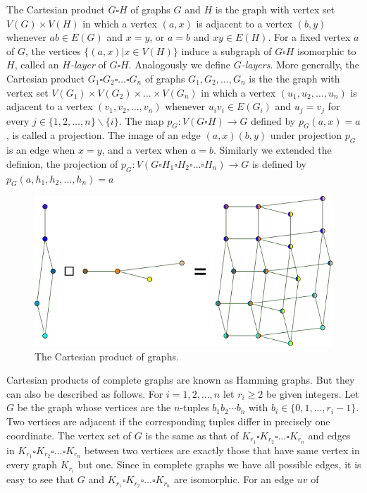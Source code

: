 \documentclass[12pt,a4paper,titlepage,openany]{report}
\begin{document}
The Cartesian product $G\square H$ of graphs $G$ and $H$ is the graph with vertex set $V(G)\times V(H)$ in which a vertex $(a,x)$ is adjacent to a vertex $(b,y)$ whenever
$ab\in E(G)$ and $x=y$, or $a=b$ and $xy\in E(H)$. For a fixed vertex $a$ of $G$, the vertices $\{(a,x)|x\in V(H)\}$ induce a subgraph of $G \square H$ isomorphic to $H$, called an \textit{$H$-layer} of $G \square H$. Analogously we define \textit{$G$-layers}.\newline
More generally, the Cartesian product $G_1\square G_2 \square \ldots \square G_n$ of graphs $G_1,G_2,\ldots, G_n$ is the the graph with vertex set $V(G_1)\times V(G_2)\times \ldots \times V(G_n)$ in which a vertex $(u_1,u_2,\ldots, u_n)$ is adjacent to a vertex $(v_1,v_2,\ldots,v_n)$ whenever $u_iv_i\in E(G_i)$ and $u_j=v_j$ for every $j\in \{1,2,\ldots,n\}\backslash \{i\}$.\newline
The map $p_G:V(G\square H) \to G$ defined by $p_G(a,x)=a$, is called a projection. The image of an edge $(a,x)(b,y)$ under projection $p_G$ is an edge when $x=y$, and a vertex when $a=b$.\newline
Similarly we extended the definion, the projection of $p_G:V(G\square H_1\square H_2\square \ldots \square H_n) \to G$ is defined by $p_G(a,h_1,h_2,\ldots,h_n)=a$
\begin{figure}\label{fig:cartProduct}
\centering
\includegraphics[scale=0.45]{figures/Graph-Cartesian-product.png}
\caption{The Cartesian product of graphs.}

\end{figure}
Cartesian products of complete graphs are known as Hamming graphs. But they can also be described as follows. For
$i=1,2,\ldots, n$ let $r_i\geq 2$ be given integers. Let $G$ be the graph whose vertices are the $n$-tuples $b_1b_2\cdots b_n$ with $b_i\in \{0,1,\ldots, r_i-1\}$. Two vertices are adjacent if the corresponding tuples differ in precisely one coordinate. The vertex set of $G$ is the same as that of $K_{r_1}\square K_{r_2}\square \ldots \square K_{r_n}$ and edges in $K_{r_1}\square K_{r_2}\square \ldots \square K_{r_n}$ between two vertices are exactly those that have same vertex in every graph $K_{r_i}$ but one. Since in complete graphs we have all possible edges, it is easy to see that $G$ and $K_{r_1}\square K_{r_2}\square \ldots \square K_{r_n}$ are isomorphic. For an edge $uv$ of
\end{document}
